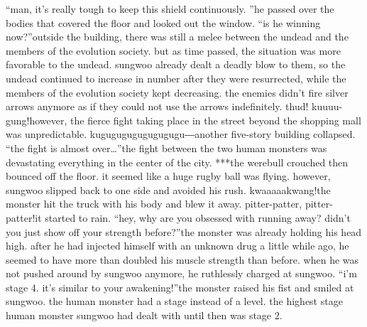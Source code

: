 “man, it’s really tough to keep this shield continuously.
”he passed over the bodies that covered the floor and looked out the window.
“is he winning now?”outside the building, there was still a melee between the undead and the members of the evolution society.
 but as time passed, the situation was more favorable to the undead.
sungwoo already dealt a deadly blow to them, so the undead continued to increase in number after they were resurrected, while the members of the evolution society kept decreasing.
the enemies didn’t fire silver arrows anymore as if they could not use the arrows indefinitely.
thud! kuuuu-gung!however, the fierce fight taking place in the street beyond the shopping mall was unpredictable.
kugugugugugugugugu―another five-story building collapsed.
“the fight is almost over…”the fight between the two human monsters was devastating everything in the center of the city.
***the werebull crouched then bounced off the floor.
 it seemed like a huge rugby ball was flying.
 however, sungwoo slipped back to one side and avoided his rush.
kwaaaaakwang!the monster hit the truck with his body and blew it away.
pitter-patter, pitter-patter!it started to rain.
“hey, why are you obsessed with running away? didn’t you just show off your strength before?”the monster was already holding his head high.
 after he had injected himself with an unknown drug a little while ago, he seemed to have more than doubled his muscle strength than before.
when he was not pushed around by sungwoo anymore, he ruthlessly charged at sungwoo.
“i’m stage 4.
 it’s similar to your awakening!”the monster raised his fist and smiled at sungwoo.
the human monster had a stage instead of a level.
 the highest stage human monster sungwoo had dealt with until then was stage 2.

